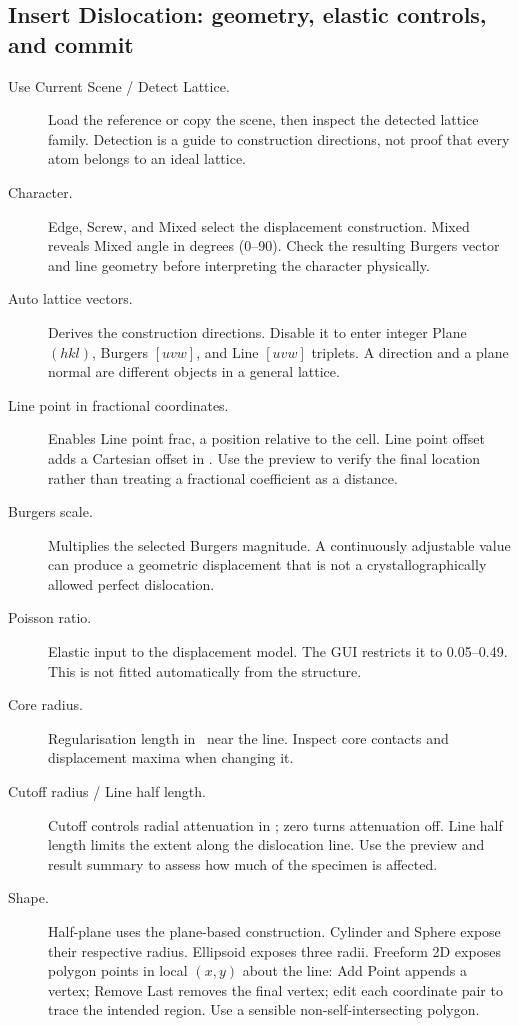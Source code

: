 \subsection{Insert Dislocation: geometry, elastic controls, and commit}
\begin{description}
\item[Use Current Scene / Detect Lattice.] Load the reference or copy the scene, then inspect the detected lattice family. Detection is a guide to construction directions, not proof that every atom belongs to an ideal lattice.
\item[Character.] Edge, Screw, and Mixed select the displacement construction. Mixed reveals Mixed angle in degrees (0--90). Check the resulting Burgers vector and line geometry before interpreting the character physically.
\item[Auto lattice vectors.] Derives the construction directions. Disable it to enter integer Plane $(hkl)$, Burgers $[uvw]$, and Line $[uvw]$ triplets. A direction and a plane normal are different objects in a general lattice.
\item[Line point in fractional coordinates.] Enables Line point frac, a position relative to the cell. Line point offset adds a Cartesian offset in \angstrom. Use the preview to verify the final location rather than treating a fractional coefficient as a distance.
\item[Burgers scale.] Multiplies the selected Burgers magnitude. A continuously adjustable value can produce a geometric displacement that is not a crystallographically allowed perfect dislocation.
\item[Poisson ratio.] Elastic input to the displacement model. The GUI restricts it to 0.05--0.49. This is not fitted automatically from the structure.
\item[Core radius.] Regularisation length in \angstrom\ near the line. Inspect core contacts and displacement maxima when changing it.
\item[Cutoff radius / Line half length.] Cutoff controls radial attenuation in \angstrom; zero turns attenuation off. Line half length limits the extent along the dislocation line. Use the preview and result summary to assess how much of the specimen is affected.
\item[Shape.] Half-plane uses the plane-based construction. Cylinder and Sphere expose their respective radius. Ellipsoid exposes three radii. Freeform 2D exposes polygon points in local $(x,y)$ about the line: Add Point appends a vertex; Remove Last removes the final vertex; edit each coordinate pair to trace the intended region. Use a sensible non-self-intersecting polygon.

\end{description}
